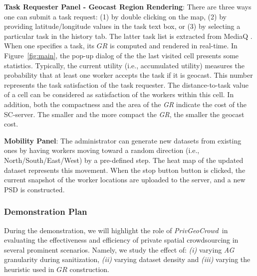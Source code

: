 \documentclass{USC-Thesis}
\newcommand{\PGC}{{\em PrivGeoCrowd}}
\numberwithin{equation}{chapter}
\begin{document}
\textbf{Task Requester Panel - Geocast Region Rendering}: There are three ways one can submit a task request: (1) by double clicking on the map, (2) by providing latitude/longitude values in the task text box, or (3) by selecting a particular task in the history tab. The latter task list is extracted from MediaQ \cite{kim2014mediaq}. When one specifies a task, its $\mathit{GR}$ is computed and rendered in real-time. In Figure~\ref{fig:main}, the pop-up dialog of the the last visited cell presents some statistics. Typically, the current utility (i.e., accumulated utility) measures the probability that at least one worker accepts the task if it is geocast. This number represents the task satisfaction of the task requester. The distance-to-task value of a cell can be considered as satisfaction of the workers within this cell. In addition, both the compactness and the area of the {\em GR} indicate the cost of the SC-server. The smaller and the more compact the {\em GR}, the smaller the geocast cost.

\textbf{Mobility Panel}: The administrator can generate new datasets from existing ones by having workers moving toward a random direction (i.e., North/South/East/West) by a pre-defined step. The heat map of the updated dataset represents this movement. When the stop button button is clicked, the current snapshot of the worker locations are uploaded to the server, and a new PSD is constructed.


\subsubsection{Demonstration Plan}
\label{sec:scenario}

During the demonstration, we will highlight the role of \PGC\ in evaluating the effectiveness and efficiency of private spatial crowdsourcing in several prominent scenarios. Namely, we study the effect of: {\em (i)} varying {\em AG} granularity during sanitization, {\em (ii)} varying dataset density and {\em (iii)} varying the heuristic used in $GR$ construction.

\end{document}
